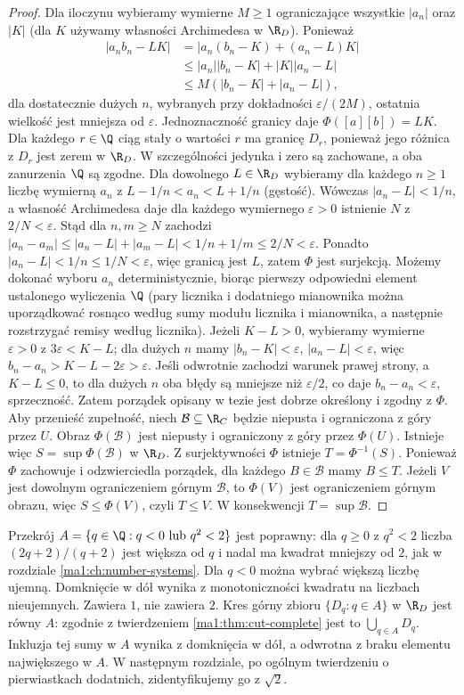 \begin{proof}
Dla iloczynu wybieramy wymierne $M\ge1$ ograniczające wszystkie $|a_n|$ oraz $|K|$ (dla $K$ używamy własności Archimedesa w $\R_D$). Ponieważ
\[
\begin{aligned}
 |a_nb_n-LK|
 &=|a_n(b_n-K)+(a_n-L)K|\\
 &\le |a_n||b_n-K|+|K||a_n-L|\\
 &\le M(|b_n-K|+|a_n-L|),
\end{aligned}
\]
dla dostatecznie dużych $n$, wybranych przy dokładności $\varepsilon/(2M)$, ostatnia wielkość jest mniejsza od $\varepsilon$. Jednoznaczność granicy daje $\Phi([a][b])=LK$. Dla każdego $r\in\Q$ ciąg stały o wartości $r$ ma granicę $D_r$, ponieważ jego różnica z $D_r$ jest zerem w $\R_D$. W szczególności jedynka i zero są zachowane, a oba zanurzenia $\Q$ są zgodne.
Dla dowolnego $L\in\R_D$ wybieramy dla każdego $n\ge1$ liczbę wymierną $a_n$ z $L-1/n<a_n<L+1/n$ (gęstość). Wówczas $|a_n-L|<1/n$, a własność Archimedesa daje dla każdego wymiernego $\varepsilon>0$ istnienie $N$ z $2/N<\varepsilon$. Stąd dla $n,m\ge N$ zachodzi $|a_n-a_m|\le |a_n-L|+|a_m-L|<1/n+1/m\le2/N<\varepsilon$. Ponadto $|a_n-L|<1/n\le1/N<\varepsilon$, więc granicą jest $L$, zatem $\Phi$ jest surjekcją. Możemy dokonać wyboru $a_n$ deterministycznie, biorąc pierwszy odpowiedni element ustalonego wyliczenia $\Q$ (pary licznika i dodatniego mianownika można uporządkować rosnąco według sumy modułu licznika i mianownika, a następnie rozstrzygać remisy według licznika).
Jeżeli $K-L>0$, wybieramy wymierne $\varepsilon>0$ z $3\varepsilon<K-L$; dla dużych $n$ mamy $|b_n-K|<\varepsilon$, $|a_n-L|<\varepsilon$, więc $b_n-a_n>K-L-2\varepsilon>\varepsilon$. Jeśli odwrotnie zachodzi warunek prawej strony, a $K-L\le0$, to dla dużych $n$ oba błędy są mniejsze niż $\varepsilon/2$, co daje $b_n-a_n<\varepsilon$, sprzeczność. Zatem porządek opisany w tezie jest dobrze określony i zgodny z $\Phi$. Aby przenieść zupełność, niech $\mathcal B\subseteq\R_C$ będzie niepusta i ograniczona z góry przez $U$. Obraz $\Phi(\mathcal B)$ jest niepusty i ograniczony z góry przez $\Phi(U)$. Istnieje więc $S=\sup\Phi(\mathcal B)$ w $\R_D$. Z surjektywności $\Phi$ istnieje $T=\Phi^{-1}(S)$. Ponieważ $\Phi$ zachowuje i odzwierciedla porządek, dla każdego $B\in\mathcal B$ mamy $B\le T$. Jeżeli $V$ jest dowolnym ograniczeniem górnym $\mathcal B$, to $\Phi(V)$ jest ograniczeniem górnym obrazu, więc $S\le\Phi(V)$, czyli $T\le V$. W konsekwencji $T=\sup\mathcal B$.
\end{proof}
\begin{przyklad}
Przekrój $A=\{q\in\Q:q<0\ \text{lub }q^2<2\}$ jest poprawny: dla $q\ge0$ z $q^2<2$ liczba $(2q+2)/(q+2)$ jest większa od $q$ i nadal ma kwadrat mniejszy od $2$, jak w rozdziale \ref{ma1:ch:number-systems}. Dla $q<0$ można wybrać większą liczbę ujemną. Domknięcie w dół wynika z monotoniczności kwadratu na liczbach nieujemnych. Zawiera $1$, nie zawiera $2$. Kres górny zbioru $\{D_q:q\in A\}$ w $\R_D$ jest równy $A$: zgodnie z twierdzeniem \ref{ma1:thm:cut-complete} jest to $\bigcup_{q\in A}D_q$. Inkluzja tej sumy w $A$ wynika z domknięcia w dół, a odwrotna z braku elementu największego w $A$. W następnym rozdziale, po ogólnym twierdzeniu o pierwiastkach dodatnich, zidentyfikujemy go z $\sqrt2$.
\end{przyklad}
